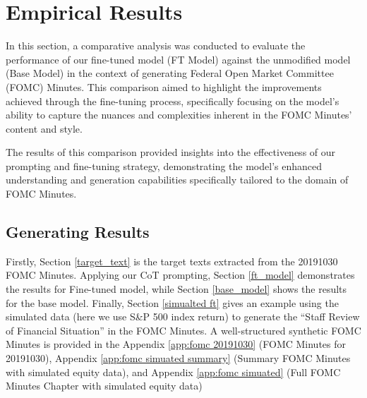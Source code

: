 

\section{Empirical Results}\label{ch3:sec:empirical results}

In this section, a comparative analysis was conducted to evaluate the performance of our fine-tuned model (FT Model) against the unmodified model (Base Model) in the context of generating Federal Open Market Committee (FOMC) Minutes. This comparison aimed to highlight the improvements achieved through the fine-tuning process, specifically focusing on the model's ability to capture the nuances and complexities inherent in the FOMC Minutes' content and style.

The results of this comparison provided insights into the effectiveness of our prompting and fine-tuning strategy, demonstrating the model's enhanced understanding and generation capabilities specifically tailored to the domain of FOMC Minutes. 

\subsection{Generating Results}

Firstly, Section \ref{target_text} is the target texts extracted from the 20191030 FOMC Minutes. Applying our CoT prompting, Section \ref{ft_model} demonstrates the results for Fine-tuned model, while Section \ref{base_model} shows the results for the base model. Finally, Section \ref{simualted ft} gives an example using the simulated data (here we use S\&P 500 index return) to generate the ``Staff Review of Financial Situation'' in the FOMC Minutes. A well-structured synthetic FOMC Minutes is provided in the Appendix \ref{app:fomc 20191030} (FOMC Minutes for 20191030), Appendix \ref{app:fomc simuated summary} (Summary FOMC Minutes with simulated equity data), and Appendix \ref{app:fomc simuated} (Full FOMC Minutes Chapter with simulated equity data)



